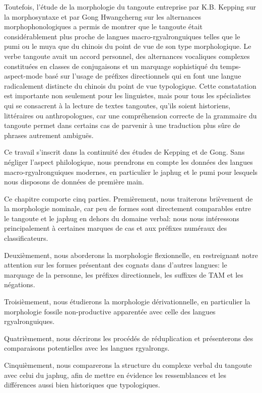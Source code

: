 \documentclass[oldfontcommands,twoside,a4paper,11pt,draft]{memoir}
\begin{document}
Toutefois, l'étude de la morphologie du tangoute entreprise par K.B. Kepping sur la morphosyntaxe et par Gong Hwangcherng sur les alternances morphophonologiques a permis de montrer que le tangoute était considérablement plus proche de langues macro-rgyalronguiques telles que le pumi ou le muya que du chinois du point de vue de son type morphologique. Le verbe tangoute avait un accord personnel, des alternances vocaliques complexes constituées en classes de conjugaisons et un marquage sophistiqué du temps-aspect-mode basé sur l'usage de préfixes directionnels qui en font une langue radicalement distincte du chinois du point de vue typologique. Cette constatation est importante non seulement pour les linguistes, mais pour tous les spécialistes qui se consacrent à la lecture de textes tangoutes, qu'ils soient historiens, littéraires ou anthropologues, car une compréhension correcte de la grammaire du tangoute permet dans certains cas de parvenir à une traduction plus sûre de phrases autrement ambiguës.


Ce travail s'inscrit dans la continuité des études de Kepping et de Gong. Sans négliger l'aspect philologique, nous prendrons en compte les données des langues macro-rgyalronguiques modernes, en particulier le japhug et le pumi pour lesquels nous disposons de données de première main.


Ce chapitre comporte cinq parties. Premièrement, nous traiterons  brièvement de la morphologie nominale, car peu de formes sont directement comparables entre le tangoute et le japhug en dehors du domaine verbal: nous nous  intéressons principalement à certaines marques de cas et aux préfixes numéraux des classificateurs.

Deuxièmement, nous aborderons  la morphologie flexionnelle, en restreignant notre attention sur les formes présentant des cognats dans d'autres langues:  le marquage de la personne, les préfixes directionnels, les suffixes de TAM et les négations. 

Troisièmement, nous étudierons la morphologie dérivationnelle, en particulier  la morphologie fossile non-productive apparentée avec celle   des langues rgyalronguiques. 

Quatrièmement, nous décrirons les procédés de réduplication  et présenterons des comparaisons potentielles avec les langues rgyalrongs. 

Cinquièmement, nous comparerons la structure du complexe verbal du tangoute avec celui du japhug, afin de mettre en évidence les ressemblances et les différences aussi bien historiques que typologiques.
\end{document}
